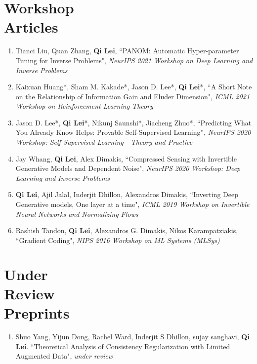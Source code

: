 \documentclass[margin, 10pt]{res} %
\begin{document}
\begin{resume}
\section{Workshop\\Articles}
\begin{enumerate}
	\item{Tianci Liu, Quan Zhang, \textbf{Qi Lei}, ``PANOM: Automatic Hyper-parameter Tuning for Inverse Problems", \textit{NeurIPS 2021 Workshop on Deep Learning and Inverse Problems} }
	\item {Kaixuan Huang*, Sham M. Kakade*, Jason D. Lee*, \textbf{Qi Lei}*,  ``A Short Note on the Relationship of Information Gain and Eluder Dimension", \textit{ICML 2021 Workshop on Reinforcement Learning Theory} }
	\item {Jason D. Lee*, \textbf{Qi Lei}*, Nikunj Saunshi*, Jiacheng Zhuo*, ``Predicting What You Already Know Helps: Provable Self-Supervised Learning”, \textit{NeurIPS 2020 Workshop: Self-Supervised Learning - Theory and Practice}}
	
\item{Jay Whang, \textbf{Qi Lei}, Alex Dimakis, 	``Compressed Sensing with Invertible Generative Models and Dependent Noise", \textit{NeurIPS 2020 Workshop: Deep Learning and Inverse Problems}
}

\item{\textbf{Qi Lei}, Ajil Jalal, Inderjit Dhillon, Alexandros Dimakis, ``Inverting Deep Generative models, One layer at a time", \textit{ICML 2019 Workshop on Invertible Neural Networks and Normalizing Flows} 	}
	
\item{Rashish Tandon, \textbf{Qi Lei}, Alexandros G. Dimakis, Nikos Karampatziakis,	``Gradient Coding", \textit{NIPS 2016 Workshop on ML Systems (MLSys)} 
}
	
\end{enumerate} 

\section{Under\\Review\\Preprints}
\begin{enumerate}
\item{Shuo Yang, Yijun Dong, Rachel Ward, Inderjit S Dhillon, sujay sanghavi, \textbf{Qi Lei}. ``Theoretical Analysis of Consistency Regularization with Limited Augmented Data", \textit{under review}}  


\end{enumerate}
\end{resume}
\end{document}
